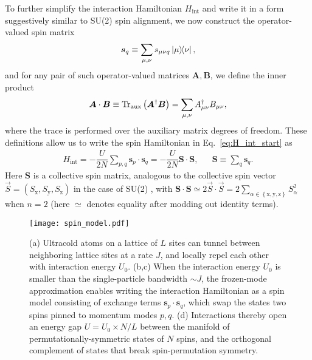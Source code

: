 \documentclass[nofootinbib,twocolumn]{revtex4-2}
\renewcommand{\t}{\text} %
\newcommand{\f}[2]{\dfrac{#1}{#2}} %
\newcommand{\p}[1]{\left(#1\right)} %
\renewcommand{\set}[1]{\left\{#1\right\}} %
\renewcommand{\v}{\bm} %
\renewcommand{\c}{\cdot} %
\newcommand{\1}{\mathds{1}}
\newcommand{\x}{\text{x}}
\newcommand{\y}{\text{y}}
\newcommand{\z}{\text{z}}
\begin{document}
To further simplify the interaction Hamiltonian $H_{\t{int}}$ and write it in a form suggestively similar to SU(2) spin alignment, we now construct the operator-valued spin matrix
\begin{align}
  \v s_q \equiv \sum_{\mu,\nu} s_{\mu\nu q} \op{\mu}{\nu},
\end{align}
and for any pair of such operator-valued matrices $\v A,\v B$, we define the inner product
\begin{align}
  \v A \c \v B \equiv \Tr_{\t{aux}}\p{\v A^\dag\v B}
  = \sum_{\mu,\nu} A_{\mu\nu}^\dag B_{\mu\nu},
  \label{eq:dot_product}
\end{align}
where the trace is performed over the auxiliary matrix degrees of freedom.
These definitions allow us to write the spin Hamiltonian in Eq.~\eqref{eq:H_int_start} as
\begin{align}
  H_{\t{int}} = -\f{U}{2N} \sum_{p,q} \v s_p\c\v s_q
  = -\f{U}{2N}\v S\c\v S,
  &&
  \v S \equiv \sum_q \v s_q.
  \label{eq:H_int}
\end{align}
Here $\v S$ is a collective spin matrix, analogous to the collective spin vector $\vec S=\p{S_\x,S_\y,S_\z}$ in the case of SU(2) \cite{he2019engineering}, with $\v S\c\v S \simeq 2 \vec S\c\vec S = 2 \sum_{\alpha\in\set{\x,\y,\z}}S_\alpha^2$ when $n=2$ (here $\simeq$ denotes equality after modding out identity terms).

\begin{figure}
\centering
\texttt{[image: spin\_model.pdf]}
\caption{
(a) Ultracold atoms on a lattice of $L$ sites can tunnel between neighboring lattice sites at a rate $J$, and locally repel each other with interaction energy $U_0$.
(b,c) When the interaction energy $U_0$ is smaller than the single-particle bandwidth $\sim J$, the frozen-mode approximation enables writing the interaction Hamiltonian as a spin model consisting of exchange terms $\v s_p\c\v s_q$, which swap the states two spins pinned to momentum modes $p,q$.
(d) Interactions thereby open an energy gap $U=U_0\times N/L$ between the manifold of permutationally-symmetric states of $N$ spins, and the orthogonal complement of states that break spin-permutation symmetry.
}
\label{fig:spin_model}
\end{figure}
\end{document}
